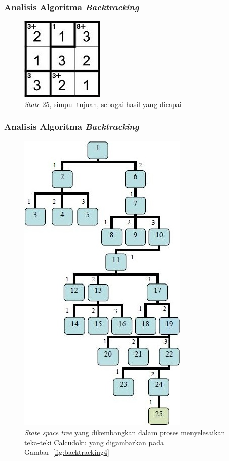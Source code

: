 \documentclass{beamer}
\begin{document}
\begin{frame}
\frametitle{Analisis Algoritma \textit{Backtracking}}
\begin{figure}
\centering
\captionsetup{justification=centering}
\includegraphics[scale=1]{Gambar/Backtracking7}
\caption[\textit{State} 25, simpul tujuan, sebagai hasil yang dicapai]{\textit{State} 25, simpul tujuan, sebagai hasil yang dicapai}
\label{fig:backtracking7}
\end{figure}
\end{frame}

\note{

}

\begin{frame}
\frametitle{Analisis Algoritma \textit{Backtracking}}
\begin{figure}
\centering
\captionsetup{justification=centering}
\includegraphics[scale=0.4]{Gambar/Backtracking8}
\caption[\textit{State space tree} yang dikembangkan dalam proses menyelesaikan teka-teki Calcudoku yang digambarkan pada Gambar~\ref{fig:backtracking4}]{\textit{State space tree} yang dikembangkan dalam proses menyelesaikan teka-teki Calcudoku yang digambarkan pada Gambar~\ref{fig:backtracking4}}
\label{fig:backtracking8}
\end{figure}
\end{frame}
\end{document}

